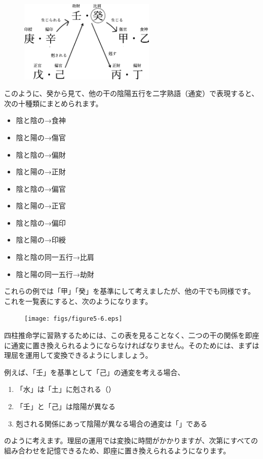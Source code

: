 \documentclass[a5paper,11pt,dvipdfmx]{tarticle}
\begin{document}
\begin{figure}
  \includegraphics[width=65mm,angle=90]{figs/figure5-5.eps}
\end{figure}

このように、癸から見て、他の干の陰陽五行を二字熟語（通変）で表現すると、次の十種類にまとめられます。

\begin{itemize}
\item 陰と陰の→食神
\item 陰と陽の→傷官
\item 陰と陰の→偏財
\item 陰と陽の→正財
\item 陰と陰の→偏官
\item 陰と陽の→正官
\item 陰と陰の→偏印
\item 陰と陽の→印綬
\item 陰と陰の同一五行→比肩
\item 陰と陽の同一五行→劫財
\end{itemize}

これらの例では「甲」「癸」を基準にして考えましたが、他の干でも同様です。これを一覧表にすると、次のようになります。

\begin{figure}[h]
  \texttt{[image: figs/figure5-6.eps]}
\end{figure}

四柱推命学に習熟するためには、この表を見ることなく、二つの干の関係を即座に通変に置き換えられるようにならなければなりません。そのためには、まずは理屈を運用して変換できるようにしましょう。

例えば、「壬」を基準として「己」の通変を考える場合、

\begin{enumerate}
\item 「水」は「土」に剋される（）
\item 「壬」と「己」は陰陽が異なる
\item 剋される関係にあって陰陽が異なる場合の通変は「」である
\end{enumerate}
のように考えます。理屈の運用では変換に時間がかかりますが、次第にすべての組み合わせを記憶できるため、即座に置き換えられるようになります。
\end{document}
